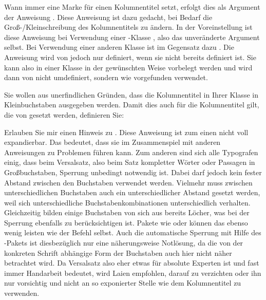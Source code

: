 \begin{Declaration}
\end{Declaration}
Wann immer  eine Marke für einen Kolumnentitel setzt,
erfolgt dies als Argument der Anweisung . Diese Anweisung
ist dazu gedacht, bei Bedarf die Groß-/Kleinschreibung des Kolumnentitels zu
ändern. In der Voreinstellung ist diese Anweisung bei Verwendung einer
\KOMAScript-Klasse
, also
das unveränderte Argument selbst. Bei Verwendung einer anderen Klasse ist
 im Gegensatz dazu
.
Die Anweisung wird von  jedoch nur definiert, wenn sie
nicht bereits definiert ist. Sie kann also in einer Klasse in der gewünschten
Weise vorbelegt werden und wird dann von  nicht umdefiniert,
sondern wie vorgefunden verwendet.
\begin{Example}
  Sie wollen aus unerfindlichen Gründen, dass die Kolumnentitel in Ihrer
  Klasse in Kleinbuchstaben ausgegeben werden. Damit dies auch für die
  Kolumnentitel gilt, die von  gesetzt werden, definieren
  Sie:
\begin{lstcode}
  \let\MakeMarkcase\MakeLowercase
\end{lstcode}
\end{Example}

Erlauben Sie mir einen Hinweis zu . Diese
Anweisung ist zum einen nicht voll expandierbar. Das bedeutet, dass sie im
Zusammenspiel mit anderen Anweisungen zu Problemen führen kann. Zum anderen
sind sich alle Typografen einig, dass beim Versalsatz, also beim Satz
kompletter Wörter oder Passagen in Großbuchstaben, Sperrung unbedingt
notwendig ist. Dabei darf jedoch kein fester Abstand zwischen den Buchstaben
verwendet werden. Vielmehr muss zwischen unterschiedlichen Buchstaben auch ein
unterschiedlicher Abstand gesetzt werden, weil sich unterschiedliche
Buchstabenkombinationen unterschiedlich verhalten. Gleichzeitig bilden einige
Buchstaben von sich aus bereits Löcher, was bei der Sperrung ebenfalls zu
berücksichtigen ist. Pakete wie  oder  können das
ebenso wenig leisten wie der Befehl  selbst. Auch die
automatische Sperrung mit Hilfe des -Pakets ist
diesbezüglich nur eine näherungsweise Notlösung, da die von der konkreten
Schrift abhängige Form der Buchstaben auch hier nicht näher betrachtet
wird. Da Versalsatz also eher etwas für absolute
Experten ist und fast immer Handarbeit bedeutet, wird Laien empfohlen, darauf
zu verzichten oder ihn nur vorsichtig und nicht an so exponierter Stelle
wie dem Kolumnentitel zu verwenden.%
\EndIndexGroup


